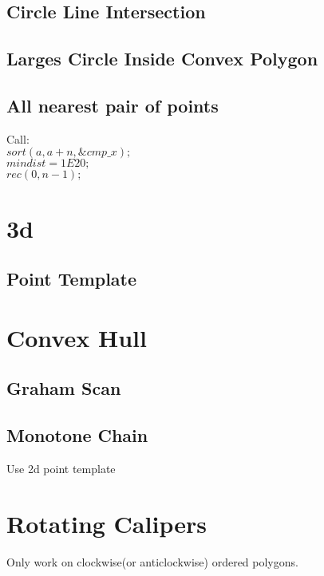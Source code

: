\documentclass[10pt,a4paper]{report}
\begin{document}
		\subsection{Circle Line Intersection}
			
		\newpage
		\subsection{Larges Circle Inside Convex Polygon}
			
		\newpage
		\subsection{All nearest pair of points}
			Call:\\
			$sort(a, a+n, \&cmp\_x);$\\
			$mindist = 1E20;$\\
			$rec (0, n-1);$\\
			
				
			
	\newpage
	\section{3d}
		\subsection{Point Template}
			
	
	\newpage
	\section{Convex Hull}
		\subsection{Graham Scan}
			
		\newpage
		\subsection{Monotone Chain}
		Use 2d point template
			
	\newpage
	\section{Rotating Calipers}
		Only work on clockwise(or anticlockwise) ordered polygons.
		
\end{document}
